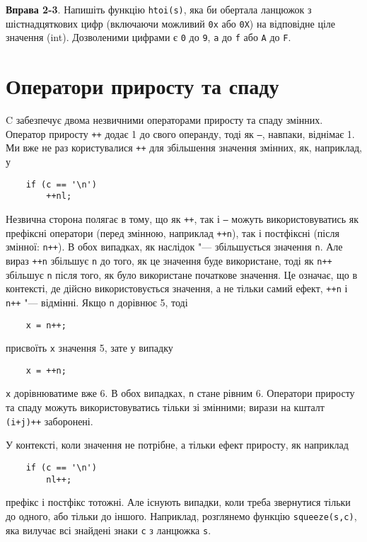 \documentclass[a4paper,12pt]{book}
\begin{document}
  \textbf{Вправа 2-3}. Напишіть функцію \texttt{htoi(s)}, яка би обертала ланцюжок з
  шістнадцяткових цифр (включаючи можливий \texttt{0x} або \texttt{0X}) на відповідне ціле
  значення (int). Дозволеними цифрами є \texttt{0} до \texttt{9}, \texttt{a} до \texttt{f}
  або \texttt{A} до \texttt{F}.

\section{Оператори приросту та спаду}


  C забезпечує двома незвичними операторами приросту та спаду змінних. Оператор приросту
  \texttt{++} додає 1 до свого операнду, тоді як \texttt{--}, навпаки, віднімає 1. Ми вже
  не раз користувалися \texttt{++} для збільшення значення змінних, як, наприклад, у
  \begin{verbatim}
    if (c == '\n')
        ++nl;
  \end{verbatim}

  Незвична сторона полягає в тому, що як \texttt{++}, так і \texttt{--} можуть
  використовуватись як префіксні оператори (перед змінною, наприклад \texttt{++n}), так і
  постфіксні (після змінної: \texttt{n++}). В обох випадках, як наслідок "---
  збільшується значення \texttt{n}. Але вираз \texttt{++n} збільшує \texttt{n} до того, як
  це значення буде використане, тоді як \texttt{n++} збільшує \texttt{n} після того, як
  було використане початкове значення. Це означає, що в контексті, де дійсно
  використовується значення, а не тільки самий ефект, \texttt{++n} і \texttt{n++} "---
  відмінні. Якщо \texttt{n} дорівнює 5, тоді
  \begin{verbatim}
    x = n++;
  \end{verbatim}
  присвоїть
  \texttt{x} значення 5, зате у випадку
  \begin{verbatim}
    x = ++n;
  \end{verbatim}
  \texttt{x} дорівнюватиме вже 6. В обох випадках, \texttt{n} стане рівним 6. Оператори
  приросту та спаду можуть використовуватись тільки зі змінними; вирази на кшталт
  \texttt{(i+j)++} заборонені.

  У контексті, коли значення не потрібне, а тільки ефект приросту, як наприклад
  \begin{verbatim}
    if (c == '\n')
        nl++;
  \end{verbatim}
  префікс і постфікс тотожні. Але існують випадки, коли
  треба звернутися тільки до одного, або тільки до іншого. Наприклад, розглянемо функцію
  \texttt{squeeze(s,c)}, яка вилучає всі знайдені знаки
  \texttt{c} з ланцюжка \texttt{s}.
\end{document}
